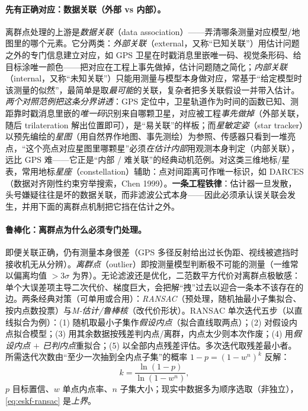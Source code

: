 \paragraph{先有正确对应：数据关联（外部 vs 内部）。}
离群点处理的上游是\emph{数据关联}（data association）——弄清哪条测量对应模型/地图里的哪个元素\cite{barfoot2024state}。它分两类：\emph{外部关联}（external，又称“已知关联”）用估计问题之外的专门信息建立对应，如 GPS 卫星在时戳消息里嵌唯一码、视觉条形码、给目标涂唯一颜色——把对应在工程上事先做掉，估计问题随之简化；\emph{内部关联}（internal，又称“未知关联”）只能用测量与模型本身做对应，常基于“给定模型时该测量的似然”，最简单是取\emph{最可能}的关联，复杂者把多关联假设一并带入估计。\emph{两个对照范例把这条分界讲透}\cite{barfoot2024state}：GPS 定位中，卫星轨道作为时间的函数已知、测距靠时戳消息里嵌的\emph{唯一码}识别来自哪颗卫星，对应被工程\emph{事先做掉}（外部关联，随后 trilateration 解出位置即可），是“易关联”的样板；而\emph{星敏定姿}（star tracker）以预先编绘的\emph{星图}（用自然界作地图、事先测绘）为参照、传感器只看到一堆亮点，“这个亮点对应星图里哪颗星”必须\emph{在估计内部}用观测本身判定（内部关联），远比 GPS 难——它正是“内部 / 难关联”的经典动机范例。对这类三维地标/星表，常用地标\emph{星座}（constellation）辅助：点对间距离可作唯一标识，如 DARCES（数据对齐刚性约束穷举搜索，Chen 1999\cite{chen1999ransac}）。\textbf{一条工程铁律}：估计器一旦发散，头号嫌疑往往是坏的数据关联，而非滤波公式本身——因此必须承认误关联会发生，并用下面的离群点机制把它挡在估计之外。

\paragraph{鲁棒化：离群点为什么必须专门处理。}
即便关联正确，仍有测量本身很差（GPS 多径反射给出过长伪距、视线被遮挡时接收机无从分辨）。\emph{离群点}（outlier）即按测量模型判断极不可能的测量（一维常以偏离均值 $>3\sigma$ 为界）。无论滤波还是优化，二范数平方代价对离群点极敏感：单个大误差项主导二次代价、梯度巨大，会把解“拽”过去以迎合一条本不该存在的边\cite{gaoxiang2019slam14}。两条经典对策（可单用或合用）\cite{barfoot2024state}：\emph{RANSAC}（预处理，随机抽最小子集拟合、按内点数投票）与\emph{M-估计/鲁棒核}（改代价形状）。RANSAC 单次迭代五步（以直线拟合为例）：(1) 随机取最小子集作\emph{假设内点}（拟合直线取两点）；(2) 对假设内点拟合模型；(3) 用其余数据按残差判内点/离群，内点太少则本次作废；(4) 用\emph{假设内点 $+$ 已判内点}重拟合；(5) 以全部内点残差评估。多次迭代取残差最小者。所需迭代次数由“至少一次抽到全内点子集”的概率 $1-p=(1-w^n)^k$ 反解：
\begin{equation}
  k=\frac{\ln(1-p)}{\ln(1-w^n)},
  \label{eq:eskf-ransac}
\end{equation}
$p$ 目标置信、$w$ 单点内点率、$n$ 子集大小；现实中数据多为顺序选取（非独立），\cref{eq:eskf-ransac} 是\emph{上界}。

